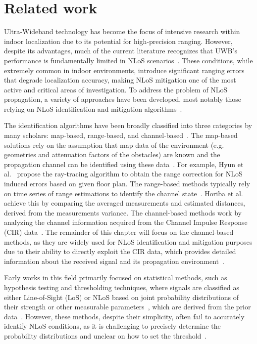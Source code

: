 \chapter{Related work}\label{related_work}

Ultra-Wideband technology has become the focus of intensive research within indoor localization due to its potential for high-precision ranging. However, despite its advantages, much of the current literature recognizes that UWB’s performance is fundamentally limited in NLoS scenarios~\cite{Elikplim2024survey}. These conditions, while extremely common in indoor environments, introduce significant ranging errors that degrade localization accuracy, making NLoS mitigation one of the most active and critical areas of investigation. To address the problem of NLoS propagation, a variety of approaches have been developed, most notably those relying on NLoS identification and mitigation algorithms~\cite{Wang2023NLoS}. 

The identification algorithms have been broadly classified into three categories by many scholars: map-based, range-based, and channel-based~\cite{khodjaev2010survey}. The map-based solutions rely on the assumption that map data of the environment (e.g. geometries and attenuation factors of the obstacles) are known and the propagation channel can be identified using these data~\cite{khodjaev2010survey}. For example, Hyun et al.~\cite{hyun2019uwb} propose the ray-tracing algorithm to obtain the range correction for NLoS induced errors based on given floor plan. The range-based methods typically rely on time series of range estimations to identify the channel state~\cite{khodjaev2010survey}. Horiba et al.~\cite{horiba2015improved} achieve this by comparing the averaged measurements and estimated distances, derived from the measurements variance. The channel-based methods work by analyzing the channel information acquired from the Channel Impulse Response (CIR) data~\cite{khodjaev2010survey, marano2010nlos}. The remainder of this chapter will focus on the channel-based methods, as they are widely used for NLoS identification and mitigation purposes due to their ability to directly exploit the CIR data, which provides detailed information about the received signal and its propagation environment~\cite{Lee2023CIR, pei2024fcn}.

Early works in this field primarily focused on statistical methods, such as hypothesis testing and thresholding techniques, where signals are classified as either Line-of-Sight (LoS) or NLoS based on joint probability distributions of their strength or other measurable parameters~\cite{venkatesh2007non}, which are derived from the prior data~\cite{schroeder2007nlos}. However, these methods, despite their simplicity, often fail to accurately identify NLoS conditions, as it is challenging to precisely determine the probability distributions and unclear on how to set the threshold~\cite{shi2014rss}.

